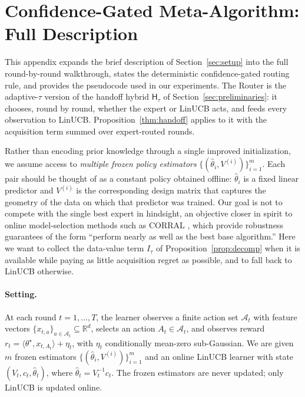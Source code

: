 \documentclass{article}
\theoremstyle{definition}
\theoremstyle{remark}
\theoremstyle{remark}
\newcommand{\Hyb}{\mathsf{H}}
\begin{document}
\section{Confidence-Gated Meta-Algorithm: Full Description}
\label{app:meta-algorithm}

This appendix expands the brief description of
Section~\ref{sec:setup} into the full round-by-round walkthrough,
states the deterministic confidence-gated routing rule, and provides
the pseudocode used in our experiments. The Router is the adaptive-$\tau$ version of the handoff hybrid
$\Hyb_\tau$ of Section~\ref{sec:preliminaries}: it chooses, round by round,
whether the expert or LinUCB acts, and feeds every observation to LinUCB.
Proposition~\ref{thm:handoff} applies to it with the acquisition term summed over
expert-routed rounds.

Rather than encoding prior knowledge through a single improved
initialization, we assume access to \emph{multiple frozen policy
estimators} $\{(\widehat\theta_i,V^{(i)})\}_{i=1}^m$. Each pair should
be thought of as a constant policy obtained offline:
$\widehat\theta_i$ is a fixed linear predictor and $V^{(i)}$ is the
corresponding design matrix that captures the geometry of the data on
which that predictor was trained. Our goal is not to compete with the
single best expert in hindsight, an objective closer in spirit to
online model-selection methods such as CORRAL
\cite{agarwal2017corralling,chen2024llmdecision}, which provide
robustness guarantees of the form ``perform nearly as well as the best
base algorithm.'' Here we want to collect the data-value term $I_\tau$ of
Proposition~\ref{prop:decomp} when it is available while paying as little
acquisition regret as possible, and to fall back to LinUCB otherwise.

\paragraph{Setting.}
At each round $t=1,\dots,T$, the learner observes a finite action set
$\mathcal A_t$ with feature vectors
$\{x_{t,a}\}_{a\in\mathcal A_t}\subseteq\mathbb R^d$, selects an action
$A_t\in\mathcal A_t$, and observes reward
$r_t = \langle\theta^\star,x_{t,A_t}\rangle + \eta_t$,
with $\eta_t$ conditionally mean-zero sub-Gaussian.
We are given $m$ frozen estimators
$\{(\widehat\theta_i,V^{(i)})\}_{i=1}^m$ and an online LinUCB learner
with state $(V_t,c_t,\widehat\theta_t)$, where
$\widehat\theta_t = V_t^{-1}c_t$. The frozen estimators are never
updated; only LinUCB is updated online.
\end{document}
